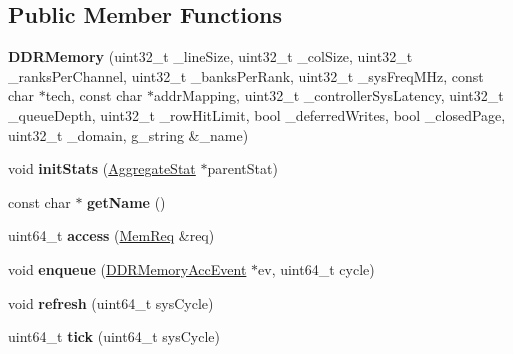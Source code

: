 \subsection*{Public Member Functions}
\begin{DoxyCompactItemize}
\item 
\hypertarget{classDDRMemory_ac06b4672c35282e8dcb99628fdd33f2d}{{\bfseries D\-D\-R\-Memory} (uint32\-\_\-t \-\_\-line\-Size, uint32\-\_\-t \-\_\-col\-Size, uint32\-\_\-t \-\_\-ranks\-Per\-Channel, uint32\-\_\-t \-\_\-banks\-Per\-Rank, uint32\-\_\-t \-\_\-sys\-Freq\-M\-Hz, const char $\ast$tech, const char $\ast$addr\-Mapping, uint32\-\_\-t \-\_\-controller\-Sys\-Latency, uint32\-\_\-t \-\_\-queue\-Depth, uint32\-\_\-t \-\_\-row\-Hit\-Limit, bool \-\_\-deferred\-Writes, bool \-\_\-closed\-Page, uint32\-\_\-t \-\_\-domain, g\-\_\-string \&\-\_\-name)}\label{classDDRMemory_ac06b4672c35282e8dcb99628fdd33f2d}

\item 
\hypertarget{classDDRMemory_a58c0d5633d6ada4c71d06a452ca716a1}{void {\bfseries init\-Stats} (\hyperlink{classAggregateStat}{Aggregate\-Stat} $\ast$parent\-Stat)}\label{classDDRMemory_a58c0d5633d6ada4c71d06a452ca716a1}

\item 
\hypertarget{classDDRMemory_a0755b4e9f98c10e62c437ae7d7111c0a}{const char $\ast$ {\bfseries get\-Name} ()}\label{classDDRMemory_a0755b4e9f98c10e62c437ae7d7111c0a}

\item 
\hypertarget{classDDRMemory_a1bc441f6c27aa782f6c10ffcc44a74aa}{uint64\-\_\-t {\bfseries access} (\hyperlink{structMemReq}{Mem\-Req} \&req)}\label{classDDRMemory_a1bc441f6c27aa782f6c10ffcc44a74aa}

\item 
\hypertarget{classDDRMemory_a749d93a0a63f591c794c9718da692c8f}{void {\bfseries enqueue} (\hyperlink{classDDRMemoryAccEvent}{D\-D\-R\-Memory\-Acc\-Event} $\ast$ev, uint64\-\_\-t cycle)}\label{classDDRMemory_a749d93a0a63f591c794c9718da692c8f}

\item 
\hypertarget{classDDRMemory_a3f20a7e4a2d31a9220f3da4b39f84768}{void {\bfseries refresh} (uint64\-\_\-t sys\-Cycle)}\label{classDDRMemory_a3f20a7e4a2d31a9220f3da4b39f84768}

\item 
\hypertarget{classDDRMemory_a5ce560abc597aef55fa3f21b28d00d58}{uint64\-\_\-t {\bfseries tick} (uint64\-\_\-t sys\-Cycle)}\label{classDDRMemory_a5ce560abc597aef55fa3f21b28d00d58}


\end{DoxyCompactItemize}
